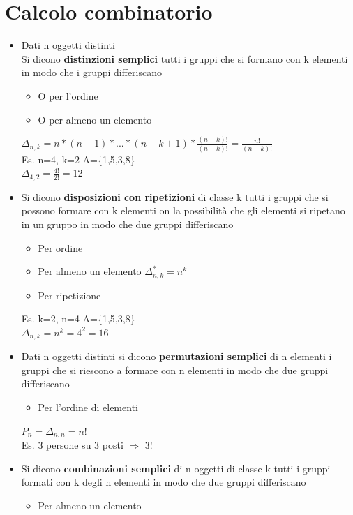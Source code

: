\documentclass{report}
\begin{document}
\section{Calcolo combinatorio}
\begin{itemize}
  \item Dati n oggetti distinti\\Si dicono \textbf{distinzioni semplici} tutti i gruppi che si formano con k elementi in modo che i gruppi differiscano
        \begin{itemize}
          \item O per l'ordine
          \item O per almeno un elemento
        \end{itemize}
        $\Delta_{n,k} = n*(n-1)*...*(n-k+1)*\frac{(n-k)!}{(n-k)!}=\frac{n!}{(n-k)!}$\\
        Es. n=4, k=2 A=\{1,5,3,8\}\\ $\Delta_{4,2} = \frac{4!}{2!}=12$
  \item Si dicono \textbf{disposizioni con ripetizioni} di classe k tutti i gruppi che si possono formare con k elementi on la possibilità che gli elementi si ripetano in un gruppo in modo che due gruppi differiscano
        \begin{itemize}
          \item Per ordine
          \item Per almeno un elemento  $\Delta_{n,k}^* = n^k$
          \item Per ripetizione
        \end{itemize}
        Es. k=2, n=4 A=\{1,5,3,8\}\\ $\Delta_{n,k} = n^k = 4^2 = 16$
  \item Dati n oggetti distinti si dicono \textbf{permutazioni semplici} di n elementi i gruppi che si riescono a formare con n elementi in modo che due gruppi differiscano
        \begin{itemize}
          \item Per l'ordine di elementi
        \end{itemize}
        $P_n=\Delta_{n,n} = n!$\\
        Es. 3 persone su 3 posti $\Rightarrow$ 3!
  \item Si dicono \textbf{combinazioni semplici} di n oggetti di classe k tutti i gruppi formati con k degli n elementi in modo che due gruppi differiscano
        \begin{itemize}
          \item Per almeno un elemento

\end{itemize}
\end{itemize}
\end{document}
